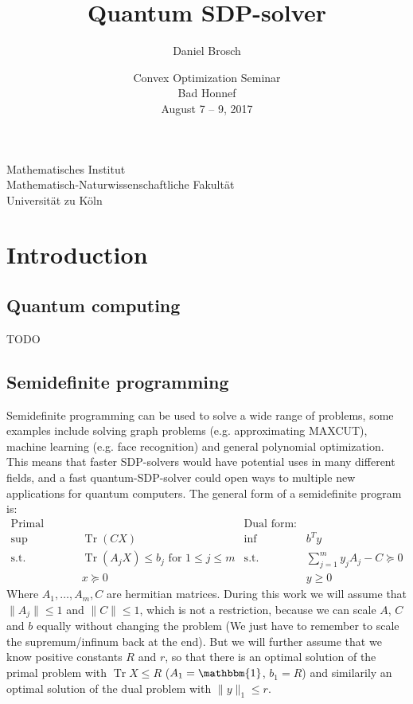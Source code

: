 \documentclass[11pt,a4paper]{scrartcl}
\author{Daniel Brosch}
\title{Quantum SDP-solver}
\date{
  Convex Optimization Seminar \\
  Bad Honnef \\
  August 7 -- 9, 2017
}
\DeclareMathOperator{\Tr}{Tr}
\begin{document}
\maketitle
{
\centering
\Large
\vspace{4cm}
Mathematisches Institut\\
Mathematisch-Naturwissenschaftliche Fakultät\\
Universität zu Köln\\
}

\thispagestyle{empty}
\newpage
{}
\tableofcontents
\thispagestyle{empty}
\newpage
\pagestyle{headings}

\section{Introduction}
\subsection{Quantum computing}
TODO
\subsection{Semidefinite programming}
Semidefinite programming can be used to solve a wide range of problems, some examples include solving graph problems (e.g. approximating MAXCUT), machine learning (e.g. face recognition) and general polynomial optimization. This means that faster SDP-solvers would have potential uses in many different fields, and a fast quantum-SDP-solver could open ways to multiple new applications for quantum computers.
The general form of a semidefinite program is:
\begin{align*}
\text{Primal form:}\quad && \text{Dual form:}\quad &\\
\sup\quad &\Tr(CX) &\inf\quad &b^T y\\
\text{s.t.}\quad &\Tr(A_jX)\leq b_j \text{ for }1\leq j\leq m &\text{s.t.}\quad &\sum_{j=1}^m y_j A_j-C\succeq 0\\
& x\succeq 0 && y\geq 0
\end{align*}
Where $A_1,\ldots, A_m, C$ are hermitian matrices. During this work we will assume that $\|A_j\|\leq 1$ and $\|C\|\leq 1$, which is not a restriction, because we can scale $A$, $C$ and $b$ equally without changing the problem (We just have to remember to scale the supremum/infinum back at the end). But we will further assume that we know positive constants $R$ and $r$, so that there is an optimal solution of the primal problem with $\Tr X\leq R$ ($A_1=\mathbbm{1}$, $b_1=R$) and similarily an optimal solution of the dual problem with $\|y\|_1\leq r$. 
\end{document}
